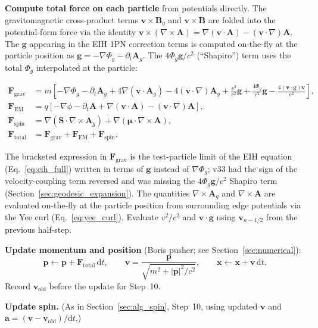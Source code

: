 \documentclass[11pt,a4paper]{article}
\newcommand{\vv}[1]{\mathbf{#1}}
\newcommand{\Phig}{\Phi_g}
\newcommand{\Ag}{\vv{A}_g}
\newcommand{\dd}{\mathrm{d}}
\begin{document}
\begin{algsteps}
  \item \textbf{Compute total force on each particle} from potentials directly.  The gravitomagnetic cross-product terms $\vv{v}\times\vv{B}_g$ and $\vv{v}\times\vv{B}$ are folded into the potential-form force via the identity $\vv{v}\times(\nabla\times\vv{A}) = \nabla(\vv{v}\cdot\vv{A}) - (\vv{v}\cdot\nabla)\vv{A}$.  The $\vv{g}$ appearing in the EIH 1PN correction terms is computed on-the-fly at the particle position as $\vv{g} = -\nabla\Phig - \partial_t\Ag$.  The $4\Phig\vv{g}/c^2$ (``Shapiro'') term uses the total $\Phig$ interpolated at the particle:
  \begin{eqbox}
  \begin{align*}
    \vv{F}_{\mathrm{grav}}  &= m\!\left[-\nabla\Phig - \partial_t\Ag
                                + 4\nabla(\vv{v}\cdot\Ag) - 4(\vv{v}\cdot\nabla)\Ag
                                + \frac{v^2}{c^2}\vv{g}
                                + \frac{4\Phig}{c^2}\vv{g}
                                - \frac{4(\vv{v}\cdot\vv{g})\vv{v}}{c^2}\right], \\[4pt]
    \vv{F}_{\mathrm{EM}}    &= q\!\left[-\nabla\phi - \partial_t\vv{A}
                                + \nabla(\vv{v}\cdot\vv{A}) - (\vv{v}\cdot\nabla)\vv{A}\right], \\[4pt]
    \vv{F}_{\mathrm{spin}}  &= \nabla(\vv{S}\cdot\nabla\times\Ag)
                              + \nabla(\boldsymbol{\mu}\cdot\nabla\times\vv{A}), \\[4pt]
    \vv{F}_{\mathrm{total}} &= \vv{F}_{\mathrm{grav}} + \vv{F}_{\mathrm{EM}} + \vv{F}_{\mathrm{spin}}.
  \end{align*}
  \end{eqbox}
  The bracketed expression in $\vv{F}_{\mathrm{grav}}$ is the test-particle limit of the EIH equation (Eq.~\ref{eq:eih_full}) written in terms of $\vv{g}$ instead of $\nabla\Phig$; v33 had the sign of the velocity-coupling term reversed and was missing the $4\Phig\vv{g}/c^2$ Shapiro term (Section~\ref{sec:geodesic_expansion}).
  The quantities $\nabla\times\Ag$ and $\nabla\times\vv{A}$ are evaluated on-the-fly at the particle position from surrounding edge potentials via the Yee curl (Eq.~\ref{eq:yee_curl}).  Evaluate $v^2/c^2$ and $\vv{v}\cdot\vv{g}$ using $\vv{v}_{n-1/2}$ from the previous half-step.

  \item \textbf{Update momentum and position} (Boris pusher; see Section~\ref{sec:numerical}):
  \begin{equation}
    \vv{p} \leftarrow \vv{p} + \vv{F}_{\mathrm{total}}\,\dd t, \qquad
    \vv{v} = \frac{\vv{p}}{\sqrt{m^2+|\vv{p}|^2/c^2}}, \qquad
    \vv{x} \leftarrow \vv{x} + \vv{v}\,\dd t.
  \end{equation}
  Record $\vv{v}_{\mathrm{old}}$ before the update for Step~10.

  \item \textbf{Update spin.} (As in Section~\ref{sec:alg_spin}, Step~10, using updated $\vv{v}$ and $\vv{a} = (\vv{v}-\vv{v}_{\mathrm{old}})/\dd t$.)
\end{algsteps}
\end{document}
